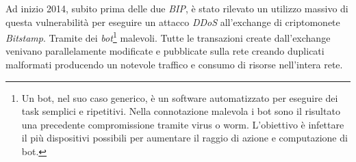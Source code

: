 Ad inizio 2014, subito prima delle due \textit{BIP}, è stato rilevato un utilizzo massivo di questa vulnerabilità per eseguire un attacco \textit{DDoS} all'exchange di criptomonete \textit{Bitstamp}. Tramite dei \textit{bot}\footnote{Un bot, nel suo caso generico, è un software automatizzato per eseguire dei task semplici e ripetitivi. Nella connotazione malevola i bot sono il risultato una precedente compromissione tramite virus o worm. L'obiettivo è infettare il più dispositivi possibili per aumentare il raggio di azione e computazione di bot.} malevoli. Tutte le transazioni create dall'exchange venivano parallelamente modificate e pubblicate sulla rete creando duplicati malformati producendo un notevole traffico e consumo di risorse nell'intera rete.

